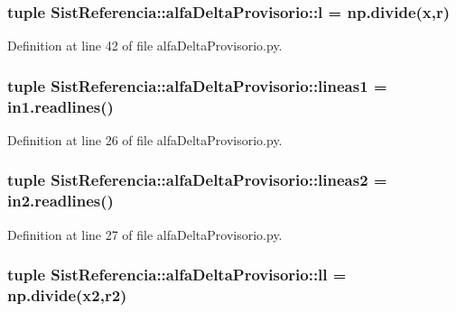 \subsubsection[{l}]{\setlength{\rightskip}{0pt plus 5cm}tuple {\bf \-Sist\-Referencia\-::alfa\-Delta\-Provisorio\-::l} = np.\-divide({\bf x},{\bf r})}\label{namespace_sist_referencia_1_1alfa_delta_provisorio_aa41286ddcfabf19d8091da4d7ac917a6}


\-Definition at line 42 of file alfa\-Delta\-Provisorio.\-py.

\subsubsection[{lineas1}]{\setlength{\rightskip}{0pt plus 5cm}tuple {\bf \-Sist\-Referencia\-::alfa\-Delta\-Provisorio\-::lineas1} = in1.\-readlines()}\label{namespace_sist_referencia_1_1alfa_delta_provisorio_a8271bcbbf4036aa5e85f067faa33ed10}


\-Definition at line 26 of file alfa\-Delta\-Provisorio.\-py.

\subsubsection[{lineas2}]{\setlength{\rightskip}{0pt plus 5cm}tuple {\bf \-Sist\-Referencia\-::alfa\-Delta\-Provisorio\-::lineas2} = in2.\-readlines()}\label{namespace_sist_referencia_1_1alfa_delta_provisorio_ad5bb1a3169d26d074ae02c7a04b5b841}


\-Definition at line 27 of file alfa\-Delta\-Provisorio.\-py.

\subsubsection[{ll}]{\setlength{\rightskip}{0pt plus 5cm}tuple {\bf \-Sist\-Referencia\-::alfa\-Delta\-Provisorio\-::ll} = np.\-divide({\bf x2},{\bf r2})}\label{namespace_sist_referencia_1_1alfa_delta_provisorio_a193e22f930abd1c0889811eb50700ec2}


